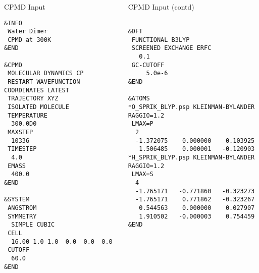 \documentclass[slidestop,mathserif,compress,xcolor=svgnames]{beamer}
\newenvironment{eblock}[0]
{
\begin{beamerboxesrounded}[upper=uppercol2,lower=lowercol2,shadow=true]}
{\end{beamerboxesrounded}}
\begin{document}
\begin{frame}[fragile]
  \frametitle{\small }
  {\fontsize{4}{5}
  \begin{columns}
  \column{5cm}
  \begin{eblock}{CPMD Input}
    \begin{verbatim}
&INFO
 Water Dimer
 CPMD at 300K
&END

&CPMD
 MOLECULAR DYNAMICS CP
 RESTART WAVEFUNCTION COORDINATES LATEST
 TRAJECTORY XYZ
 ISOLATED MOLECULE
 TEMPERATURE
  300.0D0
 MAXSTEP
  10336
 TIMESTEP
  4.0
 EMASS
  400.0
&END

&SYSTEM
 ANGSTROM
 SYMMETRY
  SIMPLE CUBIC
 CELL
  16.00 1.0 1.0  0.0  0.0  0.0
 CUTOFF
  60.0
&END
    \end{verbatim}
  \end{eblock}
  \column{5cm}
  \begin{eblock}{CPMD Input (contd)}
    \begin{verbatim}

&DFT
 FUNCTIONAL B3LYP
 SCREENED EXCHANGE ERFC
   0.1
 GC-CUTOFF
	 5.0e-6
&END

&ATOMS
*O_SPRIK_BLYP.psp KLEINMAN-BYLANDER RAGGIO=1.2
 LMAX=P
  2
  -1.372075    0.000000    0.103925
   1.506485    0.000001   -0.120903
*H_SPRIK_BLYP.psp KLEINMAN-BYLANDER RAGGIO=1.2
 LMAX=S
  4
  -1.765171   -0.771860   -0.323273
  -1.765171    0.771862   -0.323267
   0.544563    0.000000    0.027907
   1.910502   -0.000003    0.754459
&END
    \end{verbatim}
  \end{eblock}
  \end{columns}
  }
\end{frame}
\end{document}
